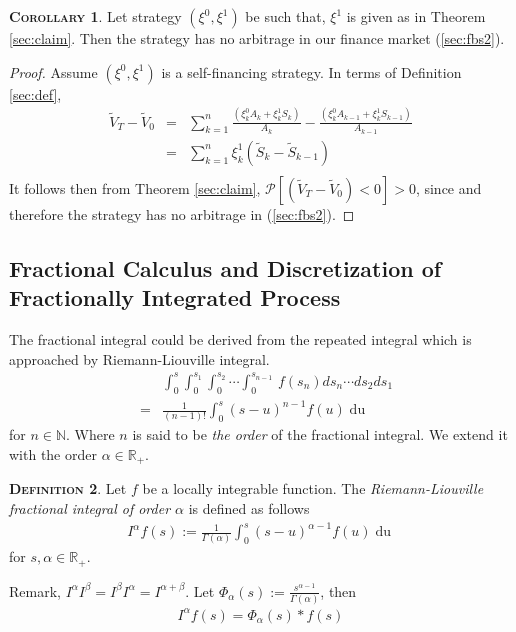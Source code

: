 \documentclass[a4paper, twoside, 11pt]{article}
\theoremstyle{definition}
\newtheorem{definition}{\scshape Definition}[section]
\newtheorem{corollary}[definition]{\scshape Corollary}
\begin{document}
\begin{corollary}
  Let strategy $(\xi^0, \xi^1)$ be such that, $\xi^1$ is given as in Theorem \ref{sec:claim}. Then the strategy has no arbitrage in our finance market (\ref{sec:fbs2}).
\end{corollary}
\begin{proof}
  Assume $(\xi^0, \xi^1)$ is a self-financing strategy. In terms of Definition \ref{sec:def},
\begin{eqnarray*}
  \tilde{V}_T - \tilde{V}_0 &=&  \sum_{k=1} ^ {n} \frac{(\xi^0_kA_{k} + \xi^1_kS_{k})}{A_{k}} - \frac{(\xi^0_{k}A_{k-1} + \xi^1_{k}S_{k-1})}{A_{k-1}}\\
  &=&  \sum_{k=1}^{n} \xi^1_k (\tilde{S}_{k} - \tilde{S}_{k-1})\\
\end{eqnarray*}
It follows then from Theorem \ref{sec:claim}, $\mathcal{P}[(\tilde{V}_T - \tilde{V}_0) < 0] > 0$, since and therefore the strategy has no arbitrage in (\ref{sec:fbs2}).
\end{proof}


\subsection{Fractional Calculus and Discretization of Fractionally Integrated Process}
The fractional integral could be derived from the repeated integral which is approached by Riemann-Liouville integral.
\begin{eqnarray*}
  &&\int_0^s\int_0^{s_1}\int_0^{s_2}\cdots\int_0^{s_{n-1}}\, f(s_n)ds_n\cdots ds_2 ds_1\\
  &=& \frac{1}{(n-1)!} \int_0^s (s-u)^{n-1} f(u) \mathop{du}
\end{eqnarray*}
for $n\in \mathbb{N}$. Where $n$ is said to be \emph{the order} of the fractional integral. We extend it with the order $\alpha \in \mathbb{R}_+$.
\begin{definition}
  Let $f$ be a locally integrable function. The \emph{Riemann-Liouville fractional integral of order $\alpha$} is defined as follows
\begin{eqnarray}
  I^\alpha f(s) := \frac{1}{\Gamma(\alpha)} \int^s_0 (s-u)^{\alpha-1} f(u) \mathop{du}
  \label{sec:fraint}
\end{eqnarray}
for $s, \alpha \in \mathbb{R}_+$.
\end{definition}

Remark, $I^\alpha I^\beta = I^\beta I^\alpha = I^{\alpha+\beta}$.
Let $\Phi_\alpha(s):= \frac{s^{\alpha-1}}{\Gamma(\alpha)}$,  then
\begin{eqnarray}
  I^\alpha f(s) = \Phi_\alpha(s) \ast f(s)
\end{eqnarray}
\end{document}
